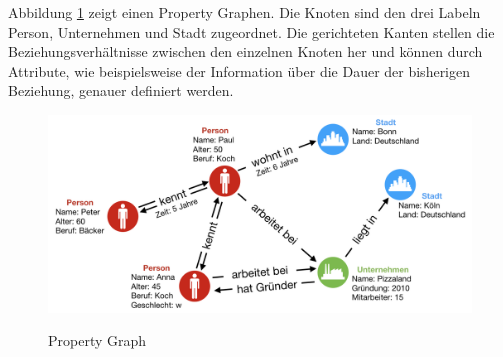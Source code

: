 Abbildung \ref{fig:property} zeigt einen Property Graphen.
Die Knoten sind den drei Labeln Person, Unternehmen und Stadt zugeordnet.
Die gerichteten Kanten stellen die Beziehungsverhältnisse zwischen den einzelnen Knoten her und können durch Attribute, wie beispielsweise der Information über die Dauer der bisherigen Beziehung, genauer definiert werden.
\begin{figure}[H]
\begin{center}
	\includegraphics[scale = 0.65]{./images/Property_graph.png}
	\label{fig:property}
	\caption{Property Graph}
\end{center}
\end{figure}

